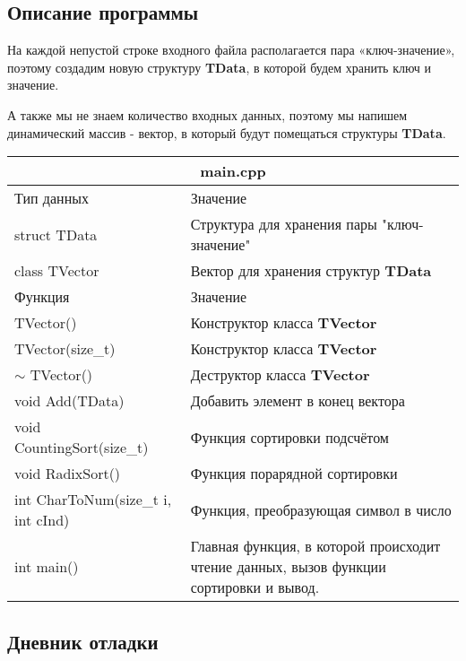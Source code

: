 \documentclass[12pt]{article}
\begin{document}
\subsection*{Описание программы}

На каждой непустой строке входного файла располагается пара «ключ-значение»,
поэтому создадим новую структуру \textbf{TData}, в которой будем хранить ключ и значение.

А также мы не знаем количество входных данных, поэтому мы напишем динамический массив - вектор, в который будут помещаться структуры \textbf{TData}.
\begin{table}[!htb]
\begin{tabular}{|m{8cm}|m{8cm}|}
\hline
\multicolumn{2}{|c|}{main.cpp} \\ 
\hline
\cellcolor{gray!25} Тип данных       & \cellcolor{gray!25} Значение\\ 
\hline
struct TData & Структура для хранения пары "ключ-значение" \\ 
\hline
class TVector & Вектор для хранения структур \textbf{TData}\\
\hline
\cellcolor{gray!25} Функция & \cellcolor{gray!25}Значение\\
\hline
TVector() & Конструктор класса \textbf{TVector} \\
\hline
TVector(size_t) & Конструктор класса \textbf{TVector} \\
\hline
$\sim$ TVector() & Деструктор класса \textbf{TVector} \\
\hline
void Add(TData) & Добавить элемент в конец вектора\\
\hline
void CountingSort(size\_t) & Функция сортировки подсчётом\\
\hline
void RadixSort() & Функция порарядной сортировки\\
\hline
int CharToNum(size\_t i, int cInd) & Функция, преобразующая символ в число\\
\hline
int main() & Главная функция, в которой происходит чтение данных, вызов функции сортировки и вывод. \\
\hline
\end{tabular}
\end{table}

\newpage

\subsection*{Дневник отладки}
\end{document}
